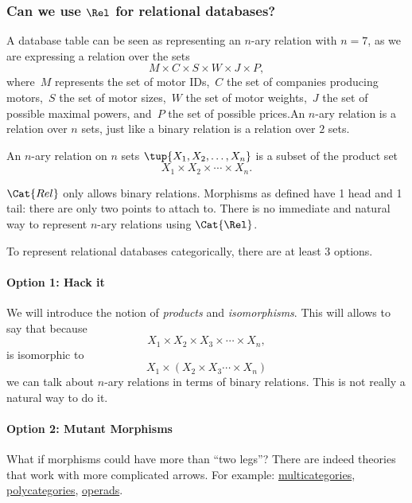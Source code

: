 \subsubsection{Can we use $\Rel$ for relational databases?}

A database table can be seen as representing an $n$-ary relation with $n = 7$, as we are expressing a relation
over the sets
\begin{equation*}
    M\times C\times S\times W\times J\times P,
\end{equation*}
where~$M$ represents the set of motor IDs,~$C$ the set of companies producing motors,~$S$ the set of motor sizes,~$W$ the set of motor weights,~$J$ the set of possible maximal powers, and~$P$ the set of possible prices.An $n$-ary relation is a relation over $n$ sets, just like a binary relation is a
relation over $2$ sets.
\begin{definition}
An $n$-ary relation on $n$ sets $\tup{X_1, X_2, \dots, X_n}$ is a
subset of the product set
\begin{equation}
X_1 \times X_2 \times \cdots \times X_n.
\end{equation}
\end{definition}

$\Cat{Rel}$ only allows binary relations. Morphisms as defined have 1 head and 1 tail:
there are only two points to attach to. There is no immediate and natural way to represent $n$-ary relations using $\Cat{\Rel}$.

To represent relational databases categorically, there are at least 3 options.

\paragraph{Option 1: Hack it}
 We will introduce the notion of \emph{products} and \emph{isomorphisms}.
    This will allows to say that because
    \begin{equation*}
    X_1 \times X_2 \times X_3 \times \cdots \times X_n,
    \end{equation*}
    is isomorphic to
    \begin{equation*}
    X_1 \times ( X_2 \times X_3 \cdots \times X_n)
    \end{equation*}
    we can talk about $n$-ary relations in terms of binary relations.
    This is not really a natural way to do it.

\paragraph{Option 2: Mutant Morphisms}
    What if morphisms could have more than ``two legs''? There
    are indeed theories that work with more complicated arrows.
    For example: \href{https://ncatlab.org/nlab/show/multicategory}{multicategories}, \href{https://ncatlab.org/nlab/show/polycategory}{polycategories}, \href{https://ncatlab.org/nlab/show/operad}{operads}.

